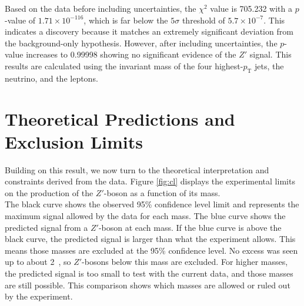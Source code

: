 Based on the data before including uncertainties, the \(\chi^2\) value is 705.232 with a \(p\)-value of \(1.71 \times 10^{-116}\), which is far below the \(5\sigma\) threshold of \(5.7 \times 10^{-7}\). This indicates a discovery because it matches an extremely significant deviation from the background-only hypothesis. However, after including uncertainties, the \(p\)-value increases to 0.99998 showing no significant evidence of the \(Z'\) signal.
This results are calculated using the invariant mass of the four highest-$p_{\mathrm{T}}$ jets, the neutrino, and the leptons.




\section{Theoretical Predictions and Exclusion Limits}

Building on this result, we now turn to the theoretical interpretation and constraints derived from the data. Figure \ref{fig:cl} displays the experimental limits on the production of the \(Z'\)-boson as a function of its mass.
\\

The black curve shows the observed 95\% confidence level limit and represents the maximum signal allowed by the data for each mass. The blue curve shows the predicted signal from a \(Z'\)-boson at each mass. If the blue curve is above the black curve, the predicted signal is larger than what the experiment allows. This means those masses are excluded at the 95\% confidence level. No excess was seen up to about 2~, so \(Z'\)-bosons below this mass are excluded. For higher masses, the predicted signal is too small to test with the current data, and those masses are still possible. This comparison shows which masses are allowed or ruled out by the experiment.





